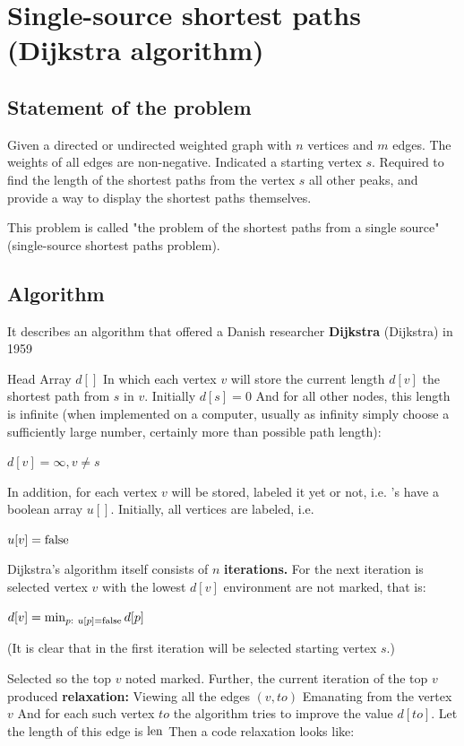 \section{ Single-source shortest paths (Dijkstra algorithm) }
\subsection{ Statement of the problem }

Given a directed or undirected weighted graph with $n$ vertices and $m$ edges. The weights of all edges are non-negative. Indicated a starting vertex $s$. Required to find the length of the shortest paths from the vertex $s$ all other peaks, and provide a way to display the shortest paths themselves.

This problem is called "the problem of the shortest paths from a single source" (single-source shortest paths problem).

\subsection{ Algorithm }

It describes an algorithm that offered a Danish researcher \textbf{Dijkstra} (Dijkstra) in 1959

Head Array $d []$ In which each vertex $v$ will store the current length $d [v]$ the shortest path from $s$ in $v$. Initially $d [s] = 0$ And for all other nodes, this length is infinite (when implemented on a computer, usually as infinity simply choose a sufficiently large number, certainly more than possible path length):

$d [v] = \infty, v \ne s$

In addition, for each vertex $v$ will be stored, labeled it yet or not, i.e. 's have a boolean array $u []$. Initially, all vertices are labeled, i.e.

$u [v] = {\rm false}$

Dijkstra's algorithm itself consists of $n$ \textbf{iterations.} For the next iteration is selected vertex $v$ with the lowest $d [v]$ environment are not marked, that is:

$d [v] = \min_ {p:\ u [p] = {\rm false}} d [p]$

(It is clear that in the first iteration will be selected starting vertex $s$.)

Selected so the top $v$ noted marked. Further, the current iteration of the top $v$ produced \textbf{relaxation:} Viewing all the edges $(v, to)$ Emanating from the vertex $v$ And for each such vertex $to$ the algorithm tries to improve the value $d [to]$. Let the length of this edge is $\rm len$ Then a code relaxation looks like:

